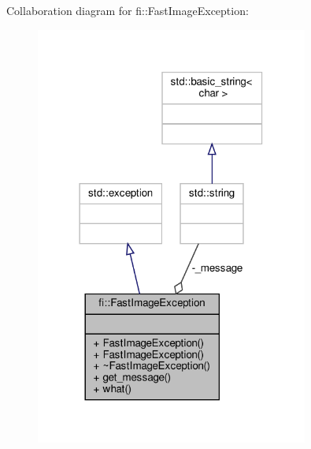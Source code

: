 Collaboration diagram for fi\+:\+:Fast\+Image\+Exception\+:
\nopagebreak
\begin{figure}[H]
\begin{center}
\leavevmode
\includegraphics[width=254pt]{d2/d8d/classfi_1_1FastImageException__coll__graph}
\end{center}
\end{figure}
